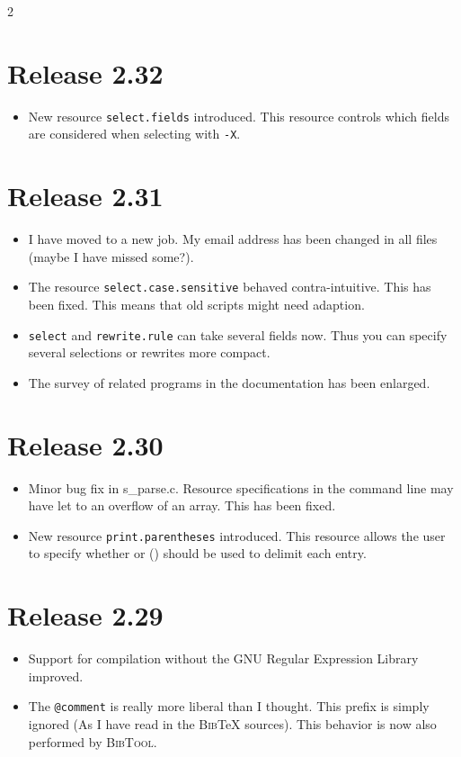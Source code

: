 \documentclass[11pt,a4paper]{scrartcl}
\newcommand\Arg[1]{\texttt{#1}}
\newcommand\rsc[1]{\texttt{#1}}
\newcommand\File[1]{\textsf{#1}}
\newcommand\BibTool{\textsc{BibTool}}
\newcommand\BibTeX{\textsc{Bib}\TeX}
\newenvironment{Releases}{\begin{multicols}2\RaggedRight}{\end{multicols}}
\newenvironment{Release}[2]{%
  \def\tmp{#2}%
  \section*{Release #1 \ifx\tmp\empty\else{\normalsize[#2]}\fi}
  \begin{itemize}
}{\end{itemize}}
\newenvironment{Fix}[1]{\item }{}
\newenvironment{New}[1]{\item }{}
\newenvironment{Doc}[1]{\item }{}
\newenvironment{Update}[1]{\item }{}
\begin{document}
\begin{Releases}
 \begin{Release}{2.32}{}
  \begin{New}{gene}
    New resource \rsc{select.fields} introduced. This resource
    controls which fields are considered when selecting with
    \Arg{-X}.
  \end{New}
 \end{Release}

 \begin{Release}{2.31}{}
  \begin{Update}{gene}
    I have moved to a new job. My email address has been changed in
    all files (maybe I have missed some?).
  \end{Update}
  \begin{Fix}{gene}
    The resource \rsc{select.case.sensitive} behaved
    contra-intuitive. This has been fixed. This means that old scripts
    might need adaption.
  \end{Fix}
  \begin{Update}{gene}
    \rsc{select} and 
\rsc{rewrite.rule} can take several
    fields now. Thus you can specify several selections or rewrites
    more compact.
  \end{Update}
  \begin{Doc}{gene}
    The survey of related programs in the documentation has been
    enlarged.
  \end{Doc}
 \end{Release}

 \begin{Release}{2.30}{}
  \begin{Fix}{gene}
    Minor bug fix in \File{s\_parse.c}. Resource specifications in
    the command line may have let to an overflow of an array. This has
    been fixed.
  \end{Fix}
  \begin{New}{gene}
    New resource \rsc{print.parentheses} introduced. This
    resource allows the user to specify whether {} or () should be
    used to delimit each entry.
  \end{New}
 \end{Release}

 \begin{Release}{2.29}{}
  \begin{Update}{gene}
    Support for compilation without the GNU Regular Expression Library
    improved.
  \end{Update}
  \begin{Update}{gene}
    The \verb|@comment| is really more liberal than I thought. This
    prefix is simply ignored (As I have read in the \BibTeX{}
    sources). This behavior is now also performed by \BibTool{}.
  \end{Update}
 \end{Release}


\end{Releases}
\end{document}
